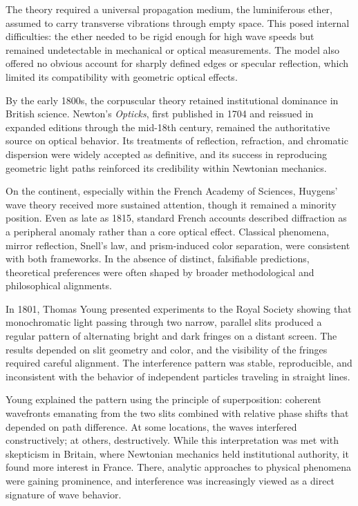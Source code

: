 The theory required a universal propagation medium, the luminiferous ether, assumed to carry transverse vibrations through empty space. This posed internal difficulties: the ether needed to be rigid enough for high wave speeds but remained undetectable in mechanical or optical measurements. The model also offered no obvious account for sharply defined edges or specular reflection, which limited its compatibility with geometric optical effects.

By the early 1800s, the corpuscular theory retained institutional dominance in British science. Newton's \textit{Opticks}, first published in 1704 and reissued in expanded editions through the mid-18th century, remained the authoritative source on optical behavior. Its treatments of reflection, refraction, and chromatic dispersion were widely accepted as definitive, and its success in reproducing geometric light paths reinforced its credibility within Newtonian mechanics.

On the continent, especially within the French Academy of Sciences, Huygens' wave theory received more sustained attention, though it remained a minority position. Even as late as 1815, standard French accounts described diffraction as a peripheral anomaly rather than a core optical effect. Classical phenomena, mirror reflection, Snell's law, and prism-induced color separation, were consistent with both frameworks. In the absence of distinct, falsifiable predictions, theoretical preferences were often shaped by broader methodological and philosophical alignments.

In 1801, Thomas Young presented experiments to the Royal Society showing that monochromatic light passing through two narrow, parallel slits produced a regular pattern of alternating bright and dark fringes on a distant screen. The results depended on slit geometry and color, and the visibility of the fringes required careful alignment. The interference pattern was stable, reproducible, and inconsistent with the behavior of independent particles traveling in straight lines.

Young explained the pattern using the principle of superposition: coherent wavefronts emanating from the two slits combined with relative phase shifts that depended on path difference. At some locations, the waves interfered constructively; at others, destructively. While this interpretation was met with skepticism in Britain, where Newtonian mechanics held institutional authority, it found more interest in France. There, analytic approaches to physical phenomena were gaining prominence, and interference was increasingly viewed as a direct signature of wave behavior.

